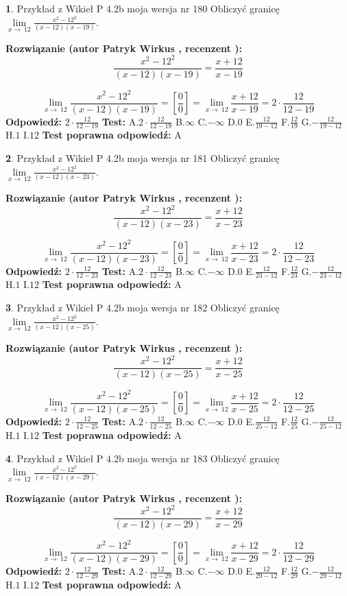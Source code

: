 \documentclass[12pt, a4paper]{article}
\theoremstyle{definition} %
\newtheorem{zad}{}
\newcommand{\zadStart}[1]{\begin{zad}#1\newline}
\newcommand{\zadStop}{\end{zad}}
\newcommand{\rozwStart}[2]{\noindent \textbf{Rozwiązanie (autor #1 , recenzent #2): }\newline}
\newcommand{\rozwStop}{\newline}
\newcommand{\odpStart}{\noindent \textbf{Odpowiedź:}\newline}
\newcommand{\odpStop}{\newline}
\newcommand{\testStart}{\noindent \textbf{Test:}\newline}
\newcommand{\testStop}{\newline}
\newcommand{\kluczStart}{\noindent \textbf{Test poprawna odpowiedź:}\newline}
\newcommand{\kluczStop}{\newline}
\begin{document}
\zadStart{Przykład z Wikieł P 4.2b moja wersja nr 180}
Obliczyć granicę $\lim\limits_{x\to\ 12}\frac{x^{2}-12^{2}}{(x-12)(x-19)}$.
\zadStop
\rozwStart{Patryk Wirkus}{}
$$\frac{x^{2}-12^{2}}{(x-12)(x-19)}=\frac{x+12}{x-19}$$

$$\lim\limits_{x\to\ 12}\frac{x^{2}-12^{2}}{(x-12)(x-19)}=[\frac{0}{0}]=\lim\limits_{x\to\ 12}\frac{x+12}{x-19}=2 \cdot \frac{12}{12-19}$$
\rozwStop
\odpStart
$2 \cdot \frac{12}{12-19}$
\odpStop
\testStart
A.$2 \cdot \frac{12}{12-19}$
B.$\infty$
C.$-\infty$
D.$0$
E.$\frac{12}{19-12}$
F.$\frac{12}{19}$
G.$-\frac{12}{19-12}$
H.$1$
I.$12$
\testStop
\kluczStart
A
\kluczStop



\zadStart{Przykład z Wikieł P 4.2b moja wersja nr 181}
Obliczyć granicę $\lim\limits_{x\to\ 12}\frac{x^{2}-12^{2}}{(x-12)(x-23)}$.
\zadStop
\rozwStart{Patryk Wirkus}{}
$$\frac{x^{2}-12^{2}}{(x-12)(x-23)}=\frac{x+12}{x-23}$$

$$\lim\limits_{x\to\ 12}\frac{x^{2}-12^{2}}{(x-12)(x-23)}=[\frac{0}{0}]=\lim\limits_{x\to\ 12}\frac{x+12}{x-23}=2 \cdot \frac{12}{12-23}$$
\rozwStop
\odpStart
$2 \cdot \frac{12}{12-23}$
\odpStop
\testStart
A.$2 \cdot \frac{12}{12-23}$
B.$\infty$
C.$-\infty$
D.$0$
E.$\frac{12}{23-12}$
F.$\frac{12}{23}$
G.$-\frac{12}{23-12}$
H.$1$
I.$12$
\testStop
\kluczStart
A
\kluczStop



\zadStart{Przykład z Wikieł P 4.2b moja wersja nr 182}
Obliczyć granicę $\lim\limits_{x\to\ 12}\frac{x^{2}-12^{2}}{(x-12)(x-25)}$.
\zadStop
\rozwStart{Patryk Wirkus}{}
$$\frac{x^{2}-12^{2}}{(x-12)(x-25)}=\frac{x+12}{x-25}$$

$$\lim\limits_{x\to\ 12}\frac{x^{2}-12^{2}}{(x-12)(x-25)}=[\frac{0}{0}]=\lim\limits_{x\to\ 12}\frac{x+12}{x-25}=2 \cdot \frac{12}{12-25}$$
\rozwStop
\odpStart
$2 \cdot \frac{12}{12-25}$
\odpStop
\testStart
A.$2 \cdot \frac{12}{12-25}$
B.$\infty$
C.$-\infty$
D.$0$
E.$\frac{12}{25-12}$
F.$\frac{12}{25}$
G.$-\frac{12}{25-12}$
H.$1$
I.$12$
\testStop
\kluczStart
A
\kluczStop



\zadStart{Przykład z Wikieł P 4.2b moja wersja nr 183}
Obliczyć granicę $\lim\limits_{x\to\ 12}\frac{x^{2}-12^{2}}{(x-12)(x-29)}$.
\zadStop
\rozwStart{Patryk Wirkus}{}
$$\frac{x^{2}-12^{2}}{(x-12)(x-29)}=\frac{x+12}{x-29}$$

$$\lim\limits_{x\to\ 12}\frac{x^{2}-12^{2}}{(x-12)(x-29)}=[\frac{0}{0}]=\lim\limits_{x\to\ 12}\frac{x+12}{x-29}=2 \cdot \frac{12}{12-29}$$
\rozwStop
\odpStart
$2 \cdot \frac{12}{12-29}$
\odpStop
\testStart
A.$2 \cdot \frac{12}{12-29}$
B.$\infty$
C.$-\infty$
D.$0$
E.$\frac{12}{29-12}$
F.$\frac{12}{29}$
G.$-\frac{12}{29-12}$
H.$1$
I.$12$
\testStop
\kluczStart
A
\kluczStop
\end{document}
